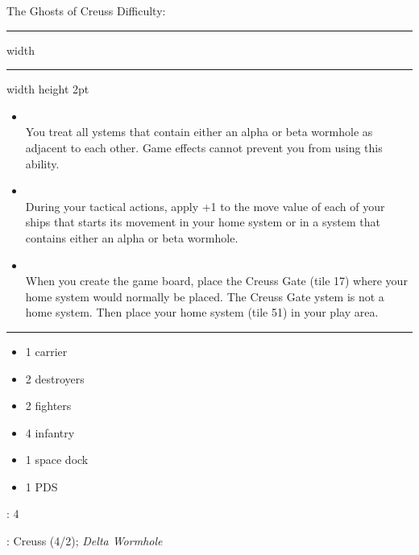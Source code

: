 {\handel\Huge The Ghosts of Creuss} \hfill {\Large Difficulty: \hard} \vspace{-4pt}\\
\hrule width \hsize \kern 1mm \hrule width \hsize height 2pt


\begin{multicols}{2}


\begin{itemize}
\item {}\\
You treat all ystems that contain either an alpha or beta wormhole as adjacent to each other. Game effects cannot prevent you from using this ability.
\item {}\\
During your tactical actions, apply +1 to the move value of each of your ships that starts its movement in your home system or in a system that contains either an alpha or beta wormhole.
\item {}\\
When you create the game board, place the Creuss Gate (tile 17) where your home system would normally be placed. The Creuss Gate ystem is not a home system. Then place your home system (tile 51) in your play area.
\end{itemize}


\vspace{-10pt}\rule{\hsize}{0.4pt}\vspace{5pt}


\vspace{-5pt}
\begin{multicols}{2}
\begin{itemize}
\item 1 carrier
\item 2 destroyers
\item 2 fighters
\item 4 infantry
\item 1 space dock
\color{white}
\item 1 PDS
\color{black}
\end{itemize}
\end{multicols}

\vspace{-5pt}
: 4

\vspace{2pt}
: Creuss (4/2); \emph{Delta Wormhole}


\end{multicols}
